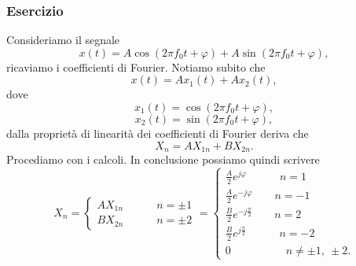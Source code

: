 \documentclass[12pt,oneside,openany]{memoir}
\numberwithin{equation}{subsection}
\begin{document}

\subsubsection{Esercizio}
Consideriamo il segnale
\begin{equation}
	x(t) = A \cos(2 \pi f_0 t + \varphi) + A \sin(2 \pi f_0 t + \varphi),
\end{equation}
ricaviamo i coefficienti di Fourier.
\bigbreak\noindent
Notiamo subito che
\begin{equation}
	x(t) = A x_1(t) + A x_2(t),
\end{equation}
dove
\begin{equation}
	x_1(t) = \cos(2 \pi f_0 t + \varphi),
\end{equation}
\begin{equation}
	x_2(t) = \sin(2 \pi f_0 t + \varphi),
\end{equation}
dalla propriet\`a di linearit\`a dei coefficienti di Fourier deriva che
\begin{equation}
	X_n = A X_{1n} + B X_{2n}.
\end{equation}
Procediamo con i calcoli.
In conclusione possiamo quindi scrivere
\begin{equation}
	X_n =
		\begin{cases}
			A X_{1n} \quad\quad\quad n = \pm 1\\
			B X_{2n} \quad\quad\quad n = \pm 2
		\end{cases}
			=
			\begin{cases}
				\frac{A}{2} e^{j \varphi} \quad\quad\quad n = 1\\
				\frac{A}{2} e^{-j \varphi} \quad\quad n = -1\\
				\frac{B}{2} e^{-j \frac{\pi}{2}} \quad\quad n = 2\\
				\frac{B}{2} e^{j \frac{\pi}{2}} \quad\quad\quad n = -2\\
				0  \quad\quad\quad\quad\quad n \neq \pm 1, \ \pm 2.
			\end{cases}
\end{equation}

\end{document}
